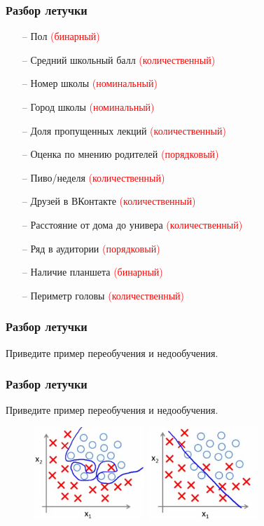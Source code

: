 \documentclass[12pt]{beamer}
\begin{document}
\begin{frame}\frametitle{Разбор летучки}
\begin{itemize}
\item[--] Пол \textcolor{red}{(бинарный)}
\item[--] Средний школьный балл \textcolor{red}{(количественный)}
\item[--] Номер школы \textcolor{red}{(номинальный)}
\item[--] Город школы  \textcolor{red}{(номинальный)}
\item[--] Доля пропущенных лекций   \textcolor{red}{(количественный)}
\item[--] Оценка по мнению родителей   \textcolor{red}{(порядковый)}
\item[--] Пиво/неделя    \textcolor{red}{(количественный)}
\item[--] Друзей в ВКонтакте   \textcolor{red}{(количественный)}
\item[--] Расстояние от дома до универа  \textcolor{red}{(количественный)}
\item[--] Ряд в аудитории  \textcolor{red}{(порядковый)}
\item[--] Наличие планшета  \textcolor{red}{(бинарный)}
\item[--] Периметр головы   \textcolor{red}{(количественный)}
\end{itemize}
\end{frame}

\begin{frame}\frametitle{Разбор летучки}
Приведите пример переобучения и недообучения.
\end{frame}

\begin{frame}\frametitle{Разбор летучки}
Приведите пример переобучения и недообучения.
\begin{figure}[htbp]
  \includegraphics[height=100pt, keepaspectratio = true]{images/overfitting}  
  \includegraphics[height=100pt, keepaspectratio = true]{images/underfitting}  
\end{figure}
\end{frame}
\end{document}
